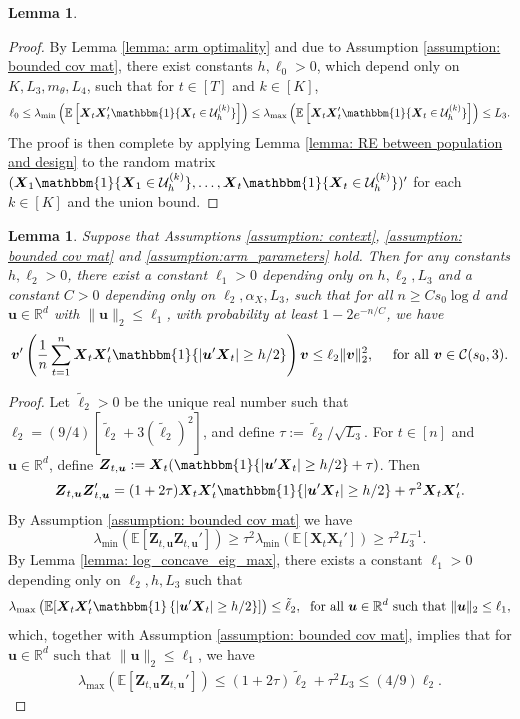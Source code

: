 \documentclass[aos,preprint]{imsart}
\theoremstyle{plain}
\newtheorem{lemma}[theorem]{Lemma}
\theoremstyle{definition}
\newcommand{\idf}{\mathbbm{1}}
\newcommand{\bX}{\boldsymbol{X}}
\newcommand{\lmin}[1]{\lambda_{\min}\left(#1\right)}
\newcommand{\lmax}[1]{\lambda_{\max}\left(#1\right)}
\newcommand{\mR}{\mathbb{R}}
\newcommand{\bu}{\boldsymbol{u}}
\newcommand{\bv}{\boldsymbol{v}}
\newcommand{\bZ}{\boldsymbol{Z}}
\newcommand{\bR}{\mathbb{R}}
\newcommand{\Exp}{\mathbb{E}}
\begin{document}
\begin{appendix}
\begin{lemma}
\end{lemma}
\begin{proof}
By Lemma \ref{lemma: arm optimality} and due to Assumption \ref{assumption: bounded cov mat}, there exist constants $h,\ell_0>0$, which depend only on $K, L_3, m_{\theta}, L_4$, such that for $t \in [T]$ and $k \in [K]$,
$$
\ell_0 \leq 
\lmin{\Exp\left[\bX_t\bX_t'\idf\{\bX_t\in\mathcal{U}_{h}^{(k)}\} \right]} \leq 
\lmax{\Exp\left[\bX_t\bX_t'\idf\{\bX_t\in\mathcal{U}_{h}^{(k)}\} \right]} \leq L_3.
$$
The proof is then complete by applying Lemma \ref{lemma: RE between population and design} to
the random matrix $(\bX_1\idf\{\bX_1\in \mathcal{U}_{h}^{(k)}\},\ldots, \bX_t\idf\{\bX_t\in \mathcal{U}_{h}^{(k)}\})'$ for each $k \in [K]$ and the union bound.
\end{proof}


\begin{lemma}\label{lemma: prediction error controlled sample}
Suppose that Assumptions \ref{assumption: context}, \ref{assumption: bounded cov mat} and \ref{assumption:arm_parameters} hold.  Then for any constants $h, \ell_2>0$, there exist a constant $\ell_1>0$ depending only on $h,\ell_2,L_3$ and a constant $C>0$ depending only on $\ell_2, \alpha_X,L_3$, such that for all $n\ge Cs_0\log d$ and  $\bu\in \mR^d$ with $\|\bu\|_2\le \ell_1$,  with probability at least $1-2e^{-n/C}$, we have  
$$
\bv'\left(\frac{1}{n}\sum_{t=1}^{n} \bX_t\bX_t'\idf\{|\bu'\bX_t|\ge h/2\} \right) \bv \le \ell_2\|\bv\|_2^2,\quad \text{ for all } 
\bv\in \mathcal{C}(s_0,3).  
$$
\end{lemma}
\begin{proof} 
Let $\tilde{\ell}_2 > 0$ be the unique real number such that $\ell_2 = (9/4)[\tilde{\ell}_2 + 3(\tilde{\ell}_2)^2]$, and define $\tau := \tilde{\ell}_2/\sqrt{L_3}$. For $t \in [n]$ and $\bu \in \bR^{d}$, define $\bZ_{t,\bu} := \bX_t(\idf\{|\bu'\bX_t|\ge h/2\}+\tau)$. Then
\begin{equation}\label{eq: arm optimality sample 1} 
    \bZ_{t,\bu}\bZ_{t,\bu}' = (1+2\tau)\bX_t\bX_t'\idf\{|\bu'\bX_t|\ge h/2\} + \tau^2\bX_t\bX_t'.
\end{equation}
By Assumption \ref{assumption: bounded cov mat} we have
$$\lmin{\Exp[\bZ_{t,\bu}\bZ_{t,\bu}']}\ge \tau^2\lmin{\Exp[\bX_t\bX_t']}\ge \tau^2 L_3^{-1}.$$
By Lemma \ref{lemma: log_concave_eig_max}, there exists a constant $\ell_1 > 0$ depending only on $\ell_2,h,L_3$ such that
\begin{align*}
    \lmax{\Exp[\bX_t\bX_t'\idf\left\{|\bu'\bX_t|\ge h/2 \right\}]} \le \tilde{\ell}_2,\; \text{ for all } \bu \in \mR^d \text{ such that } \|\bu\|_2\le \ell_1,
\end{align*}
which, together with Assumption \ref{assumption: bounded cov mat}, implies that for $\bu \in \mR^d \text{ such that } \|\bu\|_2\le \ell_1$, we have
\begin{align*}
    \lmax{\Exp[\bZ_{t,\bu}\bZ_{t,\bu}']}\le  (1+2\tau) \tilde{\ell}_2 +\tau^2 L_3 \leq (4/9)\ell_2.
\end{align*}


\end{proof}
\end{appendix}
\end{document}
